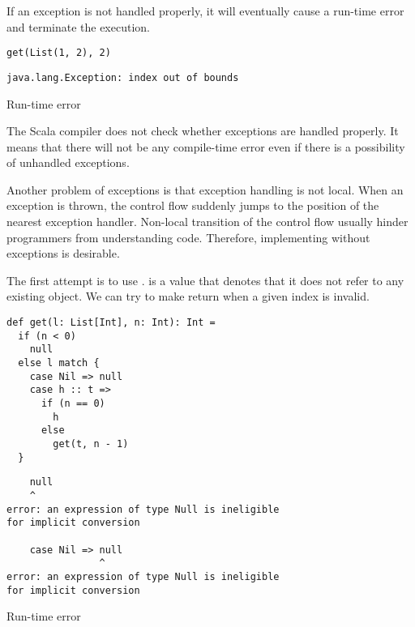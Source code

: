 If an exception is not handled properly, it will eventually cause a run-time
error and terminate the execution.

\begin{verbatim}
get(List(1, 2), 2)
\end{verbatim}
\vspace{-1em}
\begin{mdframed}[hidealllines=true,backgroundcolor=red!10,innerleftmargin=3pt,innerrightmargin=3pt,leftmargin=-3pt,rightmargin=-3pt]
\begin{verbatim}
java.lang.Exception: index out of bounds
\end{verbatim}
\vspace{-2em}
\begin{flushright}
\scriptsize\textsf{Run-time error}
\end{flushright}
\end{mdframed}

The Scala compiler does not check whether exceptions are handled properly.
It means that there will not be any compile-time error even if there is a
possibility of unhandled exceptions.

Another problem of exceptions is that exception handling is not local.
When an exception is thrown, the control flow suddenly jumps to the position of
the nearest exception handler. Non-local transition of the control flow usually
hinder programmers from understanding code.
Therefore, implementing  without exceptions is desirable.

The first attempt is to use .  is a value that denotes that
it does not refer to any existing object. We can try to make  return
 when a given index is invalid.

\begin{verbatim}
def get(l: List[Int], n: Int): Int =
  if (n < 0)
    null
  else l match {
    case Nil => null
    case h :: t =>
      if (n == 0)
        h
      else
        get(t, n - 1)
  }
\end{verbatim}
\vspace{-1em}
\begin{mdframed}[hidealllines=true,backgroundcolor=red!10,innerleftmargin=3pt,innerrightmargin=3pt,leftmargin=-3pt,rightmargin=-3pt]
\begin{verbatim}
    null
    ^
error: an expression of type Null is ineligible
for implicit conversion

    case Nil => null
                ^
error: an expression of type Null is ineligible
for implicit conversion
\end{verbatim}
\vspace{-2em}
\begin{flushright}
\scriptsize\textsf{Run-time error}
\end{flushright}
\end{mdframed}

